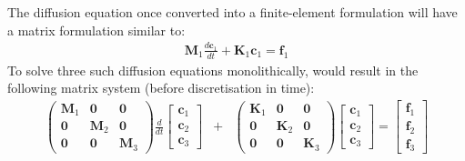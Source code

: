 The diffusion equation once converted into a finite-element formulation will have a matrix formulation similar to:
\begin{eqnarray}
\label{1compdiffusion}
\mathbf{M}_1\frac{d \mathbf{c}_1}{dt} + \mathbf{K}_1 \mathbf{c}_1 = \mathbf{f}_1
\end{eqnarray}
To solve three such diffusion equations monolithically, would result in the following matrix system (before discretisation in time):
\begin{eqnarray}
\label{3compdiffusion}
\displaystyle \left( \begin{array}{ccc}
\mathbf{M}_1   & {\boldsymbol{0}} & {\boldsymbol{0}} \\
{\boldsymbol{0}} & \mathbf{M}_2 & {\boldsymbol{0}} \\
{\boldsymbol{0}} & {\boldsymbol{0}} & \mathbf{M}_3
\end{array} \right)  
\frac{d}{dt}
\left[ \begin{array}{c}
\mathbf{c}_1\\
\mathbf{c}_2\\
\mathbf{c}_3
\end{array} \right]
& + &
\displaystyle \left( \begin{array}{ccc}
\mathbf{K}_1   & {\boldsymbol{0}} & {\boldsymbol{0}} \\
{\boldsymbol{0}} & \mathbf{K}_2 & {\boldsymbol{0}} \\
{\boldsymbol{0}} & {\boldsymbol{0}} & \mathbf{K}_3
\end{array} \right)  
\left[ \begin{array}{c}
\mathbf{c}_1\\
\mathbf{c}_2\\
\mathbf{c}_3
\end{array} \right]
=
\left[ \begin{array}{c}
\mathbf{f}_1\\
\mathbf{f}_2\\
\mathbf{f}_3
\end{array} \right]
\end{eqnarray}

